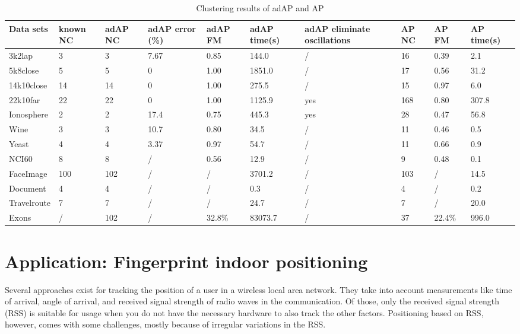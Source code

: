 \documentclass[11pt,a4paper]{article}
\begin{document}
\begin{table}[h]
	\begin{center}
		\begin{tabularx}{\textwidth}{@{}XYYYYYYYYY@{}}
			\hline
			Data sets&known NC  &adAP NC  &adAP error (\%) & adAP FM  &adAP time(s) & adAP eliminate oscillations  & AP NC  & AP FM  & AP time(s)  \\\hline
			3k2lap&3  &3  &7.67  &0.85  &144.0  &/  &16  &0.39  &2.1  \\
			5k8close&5  &5  &0  &1.00  &1851.0  &/  &17  &0.56  &31.2  \\
			14k10close&14  &14  &0  &1.00  &275.5  &/  &15  &0.97  &6.0  \\
			22k10far&22  &22  &0  &1.00  &1125.9  &yes  &168  &0.80  &307.8  \\
			Ionosphere&2  &2  &17.4  &0.75  &445.3  &yes  &28  &0.47  &56.8  \\
			Wine&3  &3  &10.7  &0.80  &34.5  &/  &11  &0.46  &0.5  \\
			Yeast&4  &4  &3.37  &0.97  &54.7  &/  &11  &0.66  &0.9  \\
			NCI60&8  &8  &/  &0.56  &12.9  &/  &9  &0.48  &0.1  \\
			FaceImage&100  &102  &/  &/  &3701.2  &/  &103  &/  &14.5  \\
			Document&4  &4  &/  &/  &0.3  &/  &4  &/  &0.2  \\
			Travelroute&7  &7  &/  &/  &24.7  &/  &7  &/  &20.0  \\
			Exons&/  &102  &/  &32.8\%  &83073.7  &/  &37  &22.4\%  &996.0\\\hline 
		\end{tabularx}
	\end{center}
	
	\caption{Clustering results of adAP and AP\cite{wang2008adaptive}}
	\label{tbl:adapres}
\end{table}
\pagebreak
\section{Application: Fingerprint indoor positioning}
Several approaches exist for tracking the position of a user in a wireless local area network. They take into account measurements like time of arrival, angle of arrival, and received signal strength of radio waves in the communication. Of those, only the received signal strength (RSS) is suitable for usage when you do not have the necessary hardware to also track the other factors. Positioning based on RSS, however, comes with some challenges, mostly because of irregular variations in the RSS. \cite{tian2013fingerprint}
\end{document}
